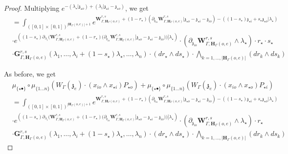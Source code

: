 \documentclass[11pt]{amsart}
\theoremstyle{definition}
\theoremstyle{remark}
\numberwithin{equation}{section}
\begin{document}
\begin{proof}
Multiplying $e^{-(\lambda_{\star}|\mathfrak{z}_{\star o})+(\lambda_i|\mathfrak{z}_{\star i}-\mathfrak{z}_{\star o})}$, we get
\begin{align*}
&  = \int_{([0,1]\times[0,1])^{|\mathbf{H}_{\Gamma}(o,e)|+1}} e^{\mathbf{W}^{r,s}_{\Gamma,\mathbf{H}_{\Gamma}(o,e)}+(1-r_{\star})\left(\partial_{\mathfrak{z}_{io}}\mathbf{W}^{r,s}_{\Gamma,\mathbf{H}_{\Gamma}(o,e)}|\mathfrak{z}_{\star o}-\mathfrak{z}_{\star i}-\mathfrak{z}_{io}\right)-\left((1-s_{\star})\mathfrak{z}_{\star i}+s_{\star}\mathfrak{z}_{\star o}|\lambda_{\star}\right)} \\
   & \cdot e^{\left((1-s_{\star})\partial_{\lambda_i}(\mathbf{W}^{r,s}_{\Gamma,\mathbf{H}_{\Gamma}(o,e)}+(1-r_{\star})(\partial_{\mathfrak{z}_{io}}\mathbf{W}^{r,s}_{\Gamma,\mathbf{H}_{\Gamma}(o,e)}|\mathfrak{z}_{\star o}-\mathfrak{z}_{\star i}-\mathfrak{z}_{io}))|\lambda_{\star}\right)}\cdot \left(\partial_{\mathfrak{z}_{io}}\mathbf{W}^{r,s}_{\Gamma,\mathbf{H}_{\Gamma}(o,e)}\wedge\lambda_{\star}\right)\cdot r_{\star}\cdot s_{\star}\\
   &\cdot  \mathbf{G}^{r,s}_{\Gamma,\mathbf{H}_{\Gamma}(o,e)}(\lambda_1,\dots,\lambda_i+(1-s_{\star})\lambda_{\star},\dots,\lambda_{n})\cdot (dr_{\star}\wedge ds_{\star})\cdot \bigwedge_{k=1,\dots,|\mathbf{H}_{\Gamma}(o,e)|} (dr_k\wedge ds_k)
\end{align*}

As before, we get
\begin{align*}
   &   \mu_{\{\star\bullet\}}\circ \mu_{\{1\dots n\}}\left(W_{\Gamma}(\mathfrak{z}_{e})\cdot (x_{io}\wedge x_{\star i})P_{\star o }\right) +  \mu_{\{\star\bullet\}}\circ \mu_{\{1\dots n\}}\left(W_{\Gamma}(\mathfrak{z}_{e})\cdot (x_{io}\wedge x_{\star o})P_{\star i }\right) \\
 &  = \int_{([0,1]\times[0,1])^{|\mathbf{H}_{\Gamma}(o,e)|+1}} e^{\mathbf{W}^{r,s}_{\Gamma,\mathbf{H}_{\Gamma}(o,e)}+(1-r_{\star})\left(\partial_{\mathfrak{z}_{io}}\mathbf{W}^{r,s}_{\Gamma,\mathbf{H}_{\Gamma}(o,e)}|\mathfrak{z}_{\star o}-\mathfrak{z}_{\star i}-\mathfrak{z}_{io}\right)-\left((1-s_{\star})\mathfrak{z}_{\star i}+s_{\star}\mathfrak{z}_{\star o}|\lambda_{\star}\right)} \\
   & \cdot e^{\left((1-s_{\star})\partial_{\lambda_i}(\mathbf{W}^{r,s}_{\Gamma,\mathbf{H}_{\Gamma}(o,e)}+(1-r_{\star})(\partial_{\mathfrak{z}_{io}}\mathbf{W}^{r,s}_{\Gamma,\mathbf{H}_{\Gamma}(o,e)}|\mathfrak{z}_{\star o}-\mathfrak{z}_{\star i}-\mathfrak{z}_{io}))|\lambda_{\star}\right)}\cdot \left(\partial_{\mathfrak{z}_{io}}\mathbf{W}^{r,s}_{\Gamma,\mathbf{H}_{\Gamma}(o,e)}\wedge\lambda_{\star}\right)\cdot r_{\star}\\
   &\cdot  \mathbf{G}^{r,s}_{\Gamma,\mathbf{H}_{\Gamma}(o,e)}(\lambda_1,\dots,\lambda_i+(1-s_{\star})\lambda_{\star},\dots,\lambda_{n})\cdot (dr_{\star}\wedge ds_{\star})\cdot \bigwedge_{k=1,\dots,|\mathbf{H}_{\Gamma}(o,e)|} (dr_k\wedge ds_k)
\end{align*}
\fi
  \end{proof}
\end{document}

